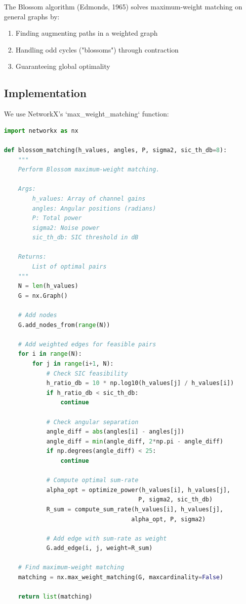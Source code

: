 The Blossom algorithm (Edmonds, 1965) solves maximum-weight matching on general graphs by:

\begin{enumerate}
    \item Finding augmenting paths in a weighted graph
    \item Handling odd cycles ("blossoms") through contraction
    \item Guaranteeing global optimality
\end{enumerate}

\subsection{Implementation}

We use NetworkX's `max_weight_matching` function:

\begin{lstlisting}[language=Python, caption={Blossom Matching Implementation}]
import networkx as nx

def blossom_matching(h_values, angles, P, sigma2, sic_th_db=8):
    """
    Perform Blossom maximum-weight matching.
    
    Args:
        h_values: Array of channel gains
        angles: Angular positions (radians)
        P: Total power
        sigma2: Noise power
        sic_th_db: SIC threshold in dB
    
    Returns:
        List of optimal pairs
    """
    N = len(h_values)
    G = nx.Graph()
    
    # Add nodes
    G.add_nodes_from(range(N))
    
    # Add weighted edges for feasible pairs
    for i in range(N):
        for j in range(i+1, N):
            # Check SIC feasibility
            h_ratio_db = 10 * np.log10(h_values[j] / h_values[i])
            if h_ratio_db < sic_th_db:
                continue
                
            # Check angular separation
            angle_diff = abs(angles[i] - angles[j])
            angle_diff = min(angle_diff, 2*np.pi - angle_diff)
            if np.degrees(angle_diff) < 25:
                continue
            
            # Compute optimal sum-rate
            alpha_opt = optimize_power(h_values[i], h_values[j],
                                      P, sigma2, sic_th_db)
            R_sum = compute_sum_rate(h_values[i], h_values[j],
                                    alpha_opt, P, sigma2)
            
            # Add edge with sum-rate as weight
            G.add_edge(i, j, weight=R_sum)
    
    # Find maximum-weight matching
    matching = nx.max_weight_matching(G, maxcardinality=False)
    
    return list(matching)
\end{lstlisting}

